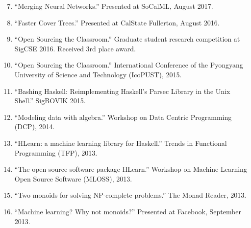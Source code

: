 \documentclass[12pt]{article}
\begin{document}
\begin{enumerate}
\setcounter{enumi}{6}
\item
``Merging Neural Networks.''  Presented at SoCalML, August 2017.

\item
``Faster Cover Trees.''  Presented at CalState Fullerton, August 2016.

\item
``Open Sourcing the Classroom.''  Graduate student research competition at SigCSE 2016.  Received 3rd place award.

\item
``Open Sourcing the Classroom.''  International Conference of the Pyongyang University of Science and Technology (IcoPUST), 2015.

\item
``Bashing Haskell: Reimplementing Haskell's Parsec Library in the Unix Shell.''
SigBOVIK 2015.

\item
``Modeling data with algebra.'' Workshop on Data Centric Programming (DCP), 2014.

\item
``HLearn: a machine learning library for Haskell.''
Trends in Functional Programming (TFP), 2013.

\item
``The open source software package HLearn.''
Workshop on Machine Learning Open Source Software (MLOSS), 2013.

\item
``Two monoids for solving NP-complete problems.''
The Monad Reader, 2013.

\item
``Machine learning? Why not monoids?''
Presented at Facebook, September 2013.
\end{enumerate}

%
%
%
\end{document}
